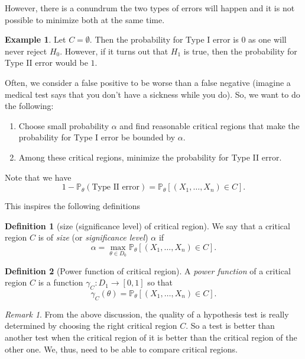 \documentclass[
  openany]{book}
\theoremstyle{definition}
\newtheorem{definition}{Definition}[chapter]
\theoremstyle{definition}
\newtheorem{example}{Example}[chapter]
\theoremstyle{definition}
\theoremstyle{definition}
\theoremstyle{remark}
\newtheorem*{remark}{Remark}
\begin{document}
However, there is a conundrum the two types of errors will happen and it is
not possible to minimize both at the same time.

\begin{example}
Let \(C = \emptyset\). Then the probability for Type I error is \(0\) as one will never
reject \(H_0\).
However, if it turns out that \(H_1\) is true, then the probability for Type II error
would be \(1\).
\end{example}

Often, we consider a false positive to be worse than a false negative (imagine
a medical test says that you don't have a sickness while you do).
So, we want to do the following:

\begin{enumerate}
\def\labelenumi{\arabic{enumi}.}
\item
  Choose small probability \(\alpha\) and find reasonable
  critical regions that make the probability for Type I error be bounded by \(\alpha\).
\item
  Among these critical regions, minimize the probability for Type II error.
\end{enumerate}

Note that we have
\[ 1 - \mathbb{P}_\theta ( \text{Type II error}) = \mathbb{P}_\theta \left[ (X_1, \dots, X_n) \in C  \right].\]

This inspires the following definitions

\begin{definition}[size (significance level) of critical region]
We say that a critical region \(C\) is of \emph{size} (or \emph{significance level}) \(\alpha\) if
\[ \alpha = \max_{\theta \in D_0} \mathbb{P}_\theta \left[ (X_1, \dots, X_n) \in C  \right].\]
\end{definition}

\begin{definition}[Power function of critical region]
A \emph{power function} of a critical region \(C\) is a function \(\gamma_C: D_1 \to [0,1]\)
so that
\[ \gamma_C(\theta) = \mathbb{P}_\theta \left[ (X_1, \dots, X_n) \in C  \right].\]
\end{definition}

\begin{remark}
From the above discussion, the quality of a hypothesis test is really determined by
choosing the right critical region \(C\). So a test is better than another test
when the critical region of it is better than the critical region of the other one.
We, thus, need to be able to compare critical regions.
\end{remark}
\end{document}
